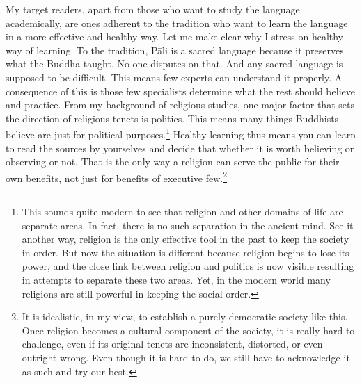 My target readers, apart from those who want to study the language academically, are ones adherent to the tradition who want to learn the language in a more effective and healthy way. Let me make clear why I stress on healthy way of learning. To the tradition, P\=ali is a sacred language because it preserves what the Buddha taught. No one disputes on that. And any sacred language is supposed to be difficult. This means few experts can understand it properly. A consequence of this is those few specialists determine what the rest should believe and practice. From my background of religious studies, one major factor that sets the direction of religious tenets is politics. This means many things Buddhists believe are just for political purposes.\footnote{This sounds quite modern to see that religion and other domains of life are separate areas. In fact, there is no such separation in the ancient mind. See it another way, religion is the only effective tool in the past to keep the society in order. But now the situation is different because religion begins to lose its power, and the close link between religion and politics is now visible resulting in attempts to separate these two areas. Yet, in the modern world many religions are still powerful in keeping the social order.} Healthy learning thus means you can learn to read the sources by yourselves and decide that whether it is worth believing or observing or not. That is the only way a religion can serve the public for their own benefits, not just for benefits of executive few.\footnote{It is idealistic, in my view, to establish a purely democratic society like this. Once religion becomes a cultural component of the society, it is really hard to challenge, even if its original tenets are inconsistent, distorted, or even outright wrong. Even though it is hard to do, we still have to acknowledge it as such and try our best.}

